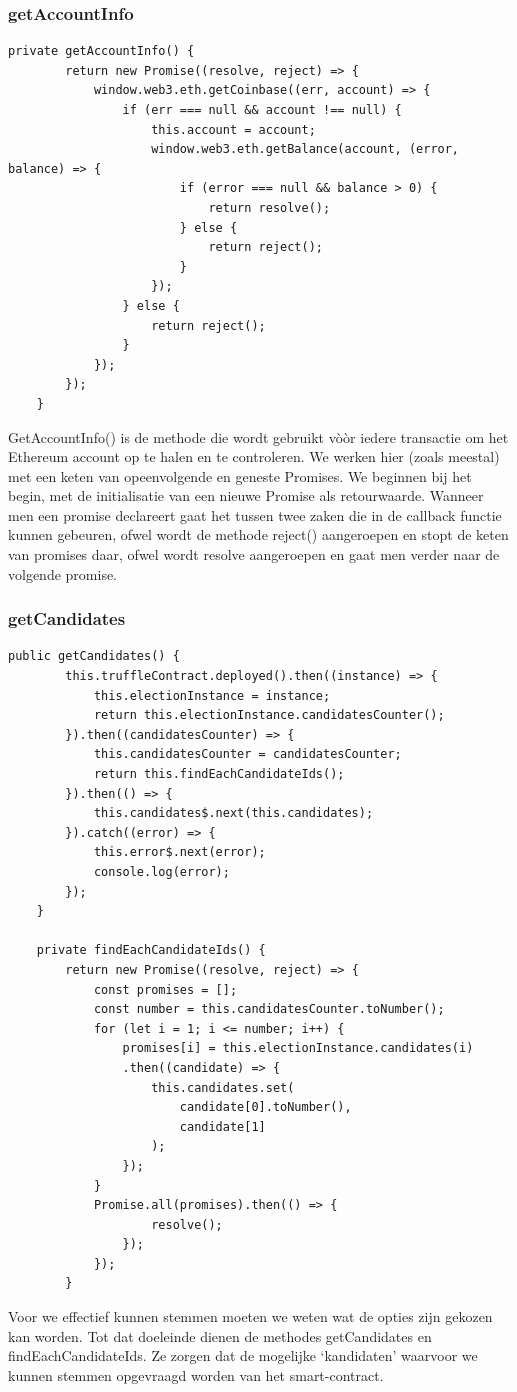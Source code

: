 	\subsubsection{getAccountInfo}
	\lstset{language=JavaScriptSolidity} 
	\begin{lstlisting}[numbers=none]
	private getAccountInfo() {
		return new Promise((resolve, reject) => {
			window.web3.eth.getCoinbase((err, account) => {
				if (err === null && account !== null) {
					this.account = account;
					window.web3.eth.getBalance(account, (error, balance) => {
						if (error === null && balance > 0) {
							return resolve();
						} else {
							return reject();
						}
					});
				} else {
					return reject();
				}
			});
		});
	}
	\end{lstlisting}
	 GetAccountInfo() is de methode die wordt gebruikt vòòr iedere transactie om het Ethereum account op te halen en te controleren. We werken hier (zoals meestal) met een keten van opeenvolgende en geneste Promises. We beginnen bij het begin, met de initialisatie van een nieuwe Promise als retourwaarde. Wanneer men een promise declareert gaat het tussen twee zaken die in de callback functie kunnen gebeuren,  ofwel wordt de methode reject() aangeroepen en stopt de keten van promises daar, ofwel wordt resolve aangeroepen en gaat men verder naar de volgende promise.
	\subsubsection{getCandidates}
	\lstset{language=JavaScriptSolidity} 
	\begin{lstlisting}[numbers=none]
	public getCandidates() {
		this.truffleContract.deployed().then((instance) => {
			this.electionInstance = instance;
			return this.electionInstance.candidatesCounter();
		}).then((candidatesCounter) => {
			this.candidatesCounter = candidatesCounter;
			return this.findEachCandidateIds();
		}).then(() => {
			this.candidates$.next(this.candidates);
		}).catch((error) => {
			this.error$.next(error);
			console.log(error);
		});
	}
		
	private findEachCandidateIds() {
		return new Promise((resolve, reject) => {
			const promises = [];
			const number = this.candidatesCounter.toNumber();
			for (let i = 1; i <= number; i++) {
				promises[i] = this.electionInstance.candidates(i)
				.then((candidate) => {
					this.candidates.set(
						candidate[0].toNumber(),
						candidate[1]
					);
				});
			}
			Promise.all(promises).then(() => {
					resolve();
				});
			});
		}
		\end{lstlisting}
		Voor we effectief kunnen stemmen moeten we weten wat de opties zijn gekozen kan worden. Tot dat doeleinde dienen de methodes getCandidates en findEachCandidateIds. Ze zorgen dat de mogelijke `kandidaten' waarvoor we kunnen stemmen opgevraagd worden van het smart-contract. 
		
